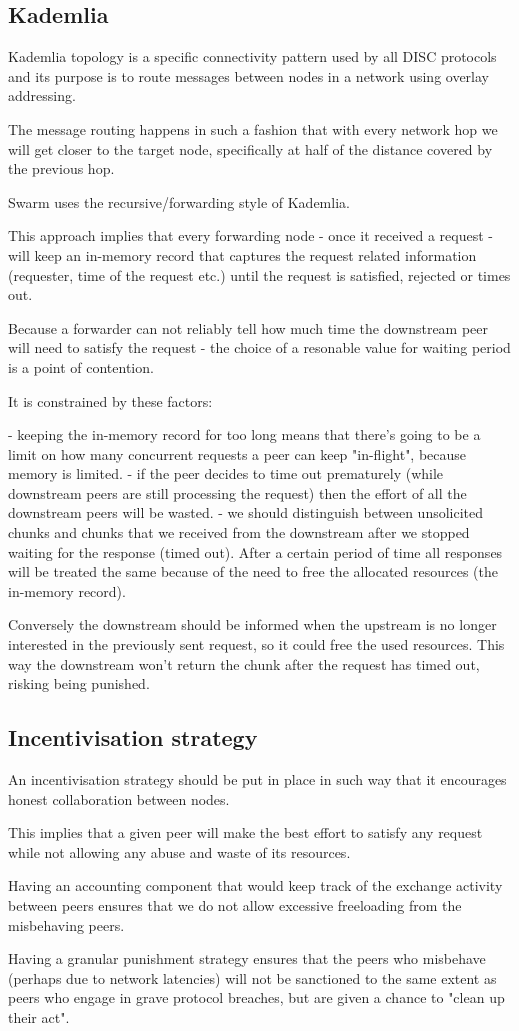 \subsection{Kademlia}

Kademlia topology is a specific connectivity pattern used by all DISC protocols and its purpose is to route messages between nodes in a network using overlay addressing.

The message routing happens in such a fashion that with every network hop we will get closer to the target node, specifically at half of the distance covered by the previous hop.

Swarm uses the recursive/forwarding style of Kademlia.

This approach implies that every forwarding node - once it received a request - will keep an in-memory record that captures the request related information (requester, time of the request etc.) until the request is satisfied, rejected or times out.

Because a forwarder can not reliably tell how much time the downstream peer will need to satisfy the request - the choice of a resonable value for waiting period is a point of contention.

It is constrained by these factors:

- keeping the in-memory record for too long means that there's going to be a limit on how many concurrent requests a peer can keep "in-flight", because memory is limited.
- if the peer decides to time out prematurely (while downstream peers are still processing the request) then the effort of all the downstream peers will be wasted.
- we should distinguish between unsolicited chunks and chunks that we received from the downstream after we stopped waiting for the response (timed out). After a certain period of time all responses will be treated the same because of the need to free the allocated resources (the in-memory record).

Conversely the downstream should be informed when the upstream is no longer interested in the previously sent request, so it could free the used resources. This way the downstream won't return the chunk after the request has timed out, risking being punished.

\subsection{Incentivisation strategy}

An incentivisation strategy should be put in place in such way that it encourages honest collaboration between nodes.

This implies that a given peer will make the best effort to satisfy any request while not allowing any abuse and waste of its resources.

Having an accounting component that would keep track of the exchange activity between peers ensures that we do not allow excessive freeloading from the misbehaving peers.

Having a granular punishment strategy ensures that the peers who misbehave (perhaps due to network latencies) will not be sanctioned to the same extent as peers who engage in grave protocol breaches, but are given a chance to "clean up their act".
